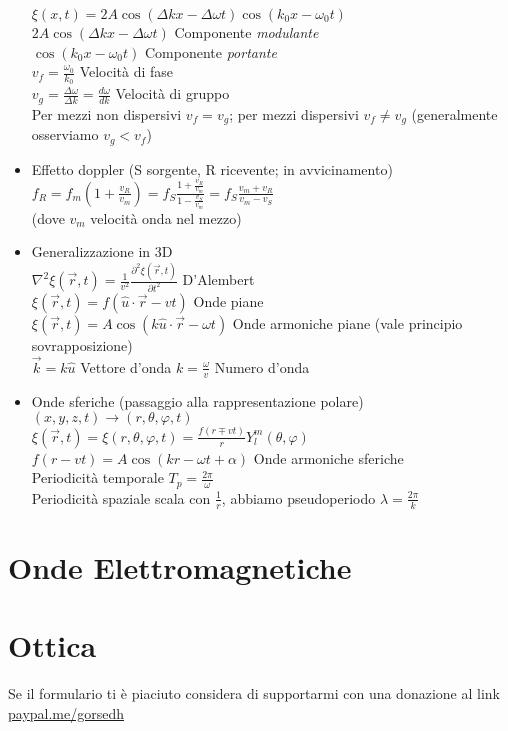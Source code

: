 \documentclass[a4paper]{article}
\begin{document}
\begin{itemize}
 	$\xi(x,t)=2A\cos(\Delta k x-\Delta \omega t)\cos(k_0 x-\omega_0t)$\\
 	$2A\cos(\Delta k x-\Delta \omega t)$ \hspace{0.4cm} Componente \textit{modulante}\\
 	$\cos(k_0 x-\omega_0t)$ \hspace{0.4cm} Componente \textit{portante}\\
 	$v_f=\frac{\omega_0}{k_0}$ \hspace{0.4cm} Velocità di fase\\
 	$v_g=\frac{\Delta \omega}{\Delta k} =\frac{d\omega}{dk}$ \hspace{0.4cm} Velocità di gruppo\\
 	Per mezzi non dispersivi $v_f=v_g$; per mezzi dispersivi $v_f\neq v_g$ (generalmente osserviamo $v_g<v_f$)
 	\item Effetto doppler (S sorgente, R ricevente; in avvicinamento)\\ 
 	$f_R=f_m(1+\frac{v_R}{v_m})=f_S\frac{1+\frac{v_R}{v_m}}{1-\frac{v_S}{v_m}}=f_S \frac{v_m + v_R}{v_m-v_S}$ \\
 	(dove $v_m$ velocità onda nel mezzo)
 	\item Generalizzazione in  3D\\
 	$\nabla^2 \xi(\overrightarrow{r},t)=\frac{1}{v^2}\frac{\partial^2 \xi(\overrightarrow{r},t)}{\partial t^2}$ D'Alembert\\
 	$\xi(\overrightarrow{r},t)=f(\hat{u}  \cdot \overrightarrow{r}-vt)$ Onde piane\\
 	$\xi(\overrightarrow{r},t)=A\cos(k\hat{u}\cdot \overrightarrow{r}-\omega t)$ Onde armoniche piane (vale principio sovrapposizione)\\
 	$\overrightarrow{k}=k \hat{u}$ Vettore d'onda
 	$k=\frac{\omega}{v}$ Numero d'onda
 	\item Onde sferiche (passaggio alla rappresentazione polare) $(x,y,z,t)\rightarrow(r,\theta,\varphi,t)$\\
 	$\xi(\overrightarrow{r},t)=\xi(r,\theta,\varphi,t)=\frac{f(r\mp vt)}{r}Y^m_l(\theta, \varphi)$\\
 	$f(r-vt)=A\cos (kr-\omega t+\alpha)$ Onde armoniche sferiche\\
 	Periodicità temporale $T_p =\frac{2\pi}{\omega}$\\
 	Periodicità spaziale scala con $\frac{1}{r}$, abbiamo pseudoperiodo $\lambda = \frac{2\pi}{k}$\\
 	
 	
 \end{itemize}	


\section{Onde Elettromagnetiche}
\section{Ottica}

Se il formulario ti è piaciuto considera di supportarmi con una donazione al link \href{paypal.me/gorsedh}{paypal.me/gorsedh}
\end{document}
